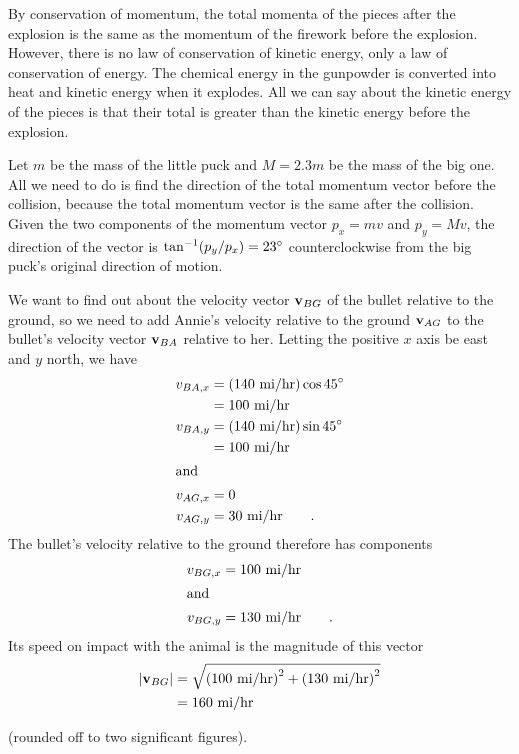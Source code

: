 By conservation of momentum, the total momenta of the pieces
after the explosion is the same as the momentum of the firework
before the explosion. However, there is no law of conservation
of kinetic energy, only a law of conservation of energy. The chemical
energy in the gunpowder is converted into heat and kinetic energy when
it explodes. All we can say about the kinetic energy of the pieces is
that their total is greater than the kinetic energy before the
explosion.

Let $m$ be the mass of the little puck and $M=2.3m$ be
the mass of the big one. All we need to do is find the
direction of the total momentum vector before the collision,
because the total momentum vector is the same after the
collision. Given the two components of the momentum vector
$p_x=mv$ and $p_y=Mv$, the direction of the
vector is $\tan^{-1}(p_y/p_x)=23\mspace{0mu}^\circ$ counterclockwise from
the big puck's original direction of motion.

We want to find out about the velocity vector $\textbf{v}_{BG}$ of the bullet relative to the ground,
so we need to add Annie's velocity relative to the ground $\textbf{v}_{AG}$ to the bullet's velocity vector $\textbf{v}_{BA}$ relative to her. Letting the positive $x$ axis be east and $y$ north, we have
\begin{align*}
	v_{BA,x}	&= \textup{(140\ mi/hr)} \cos 45\mspace{0mu}^\circ \\
			&= \textup{100\ mi/hr} \\
	v_{BA,y}	&= \textup{(140\ mi/hr)} \sin 45\mspace{0mu}^\circ \\
			&= \textup{100\ mi/hr} \\
\intertext{and}
	v_{AG,x}	&= 0 \\
	v_{AG,y}	&= \textup{30\ mi/hr} \qquad   . 
\end{align*}
The bullet's velocity relative to the ground therefore has components
\begin{align*}
	v_{BG,x}	&= \textup{100\ mi/hr}   \\
\intertext{and} 
	v_{BG,y}	&= \textup{130\ mi/hr}   \qquad . \\
\end{align*}
Its speed on impact with the animal is the magnitude of this vector
\begin{align*}
	|\zb{v}_{BG}|	&=  \sqrt{\zu{(100\ mi/hr)}^2+\zu{(130\ mi/hr)}^2}\\
			&= 160\ \zu{mi/hr}
\end{align*}

(rounded off to two significant figures).

